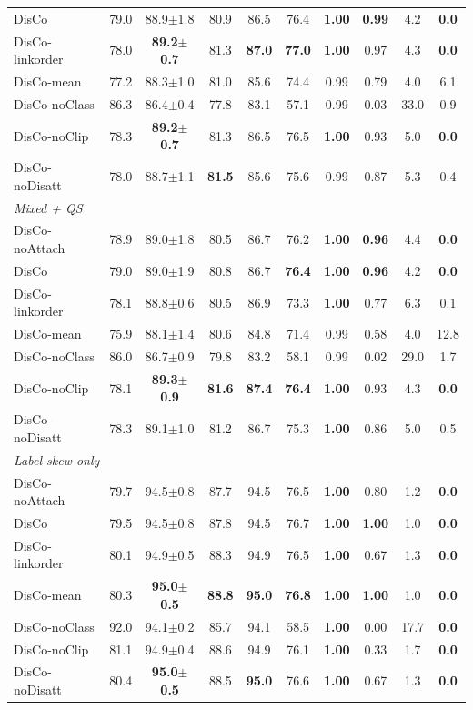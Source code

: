 \begin{tabular}{lccccccccc}
DisCo & 79.0 & 88.9$\pm$1.8 & 80.9 & 86.5 & 76.4 & \textbf{1.00} & \textbf{0.99} & 4.2 & \textbf{0.0} \\
DisCo-linkorder & 78.0 & \textbf{89.2$\pm$0.7} & 81.3 & \textbf{87.0} & \textbf{77.0} & \textbf{1.00} & 0.97 & 4.3 & \textbf{0.0} \\
DisCo-mean & 77.2 & 88.3$\pm$1.0 & 81.0 & 85.6 & 74.4 & 0.99 & 0.79 & 4.0 & 6.1 \\
DisCo-noClass & 86.3 & 86.4$\pm$0.4 & 77.8 & 83.1 & 57.1 & 0.99 & 0.03 & 33.0 & 0.9 \\
DisCo-noClip & 78.3 & \textbf{89.2$\pm$0.7} & 81.3 & 86.5 & 76.5 & \textbf{1.00} & 0.93 & 5.0 & \textbf{0.0} \\
DisCo-noDisatt & 78.0 & 88.7$\pm$1.1 & \textbf{81.5} & 85.6 & 75.6 & 0.99 & 0.87 & 5.3 & 0.4 \\
\midrule
\multicolumn{10}{l}{\textit{Mixed + QS}}\\
DisCo-noAttach & 78.9 & 89.0$\pm$1.8 & 80.5 & 86.7 & 76.2 & \textbf{1.00} & \textbf{0.96} & 4.4 & \textbf{0.0} \\
DisCo & 79.0 & 89.0$\pm$1.9 & 80.8 & 86.7 & \textbf{76.4} & \textbf{1.00} & \textbf{0.96} & 4.2 & \textbf{0.0} \\
DisCo-linkorder & 78.1 & 88.8$\pm$0.6 & 80.5 & 86.9 & 73.3 & \textbf{1.00} & 0.77 & 6.3 & 0.1 \\
DisCo-mean & 75.9 & 88.1$\pm$1.4 & 80.6 & 84.8 & 71.4 & 0.99 & 0.58 & 4.0 & 12.8 \\
DisCo-noClass & 86.0 & 86.7$\pm$0.9 & 79.8 & 83.2 & 58.1 & 0.99 & 0.02 & 29.0 & 1.7 \\
DisCo-noClip & 78.1 & \textbf{89.3$\pm$0.9} & \textbf{81.6} & \textbf{87.4} & \textbf{76.4} & \textbf{1.00} & 0.93 & 4.3 & \textbf{0.0} \\
DisCo-noDisatt & 78.3 & 89.1$\pm$1.0 & 81.2 & 86.7 & 75.3 & \textbf{1.00} & 0.86 & 5.0 & 0.5 \\
\midrule
\multicolumn{10}{l}{\textit{Label skew only}}\\
DisCo-noAttach & 79.7 & 94.5$\pm$0.8 & 87.7 & 94.5 & 76.5 & \textbf{1.00} & 0.80 & 1.2 & \textbf{0.0} \\
DisCo & 79.5 & 94.5$\pm$0.8 & 87.8 & 94.5 & 76.7 & \textbf{1.00} & \textbf{1.00} & 1.0 & \textbf{0.0} \\
DisCo-linkorder & 80.1 & 94.9$\pm$0.5 & 88.3 & 94.9 & 76.5 & \textbf{1.00} & 0.67 & 1.3 & \textbf{0.0} \\
DisCo-mean & 80.3 & \textbf{95.0$\pm$0.5} & \textbf{88.8} & \textbf{95.0} & \textbf{76.8} & \textbf{1.00} & \textbf{1.00} & 1.0 & \textbf{0.0} \\
DisCo-noClass & 92.0 & 94.1$\pm$0.2 & 85.7 & 94.1 & 58.5 & \textbf{1.00} & 0.00 & 17.7 & \textbf{0.0} \\
DisCo-noClip & 81.1 & 94.9$\pm$0.4 & 88.6 & 94.9 & 76.1 & \textbf{1.00} & 0.33 & 1.7 & \textbf{0.0} \\
DisCo-noDisatt & 80.4 & \textbf{95.0$\pm$0.5} & 88.5 & \textbf{95.0} & 76.6 & \textbf{1.00} & 0.67 & 1.3 & \textbf{0.0} \\
\bottomrule
\end{tabular}
